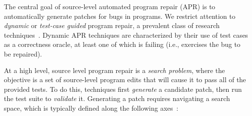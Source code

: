 \documentclass[10pt, conference]{IEEEtran}
\begin{document}
The central goal of source-level automated program repair (APR) is to
automatically generate patches for bugs in programs. We restrict attention to
\emph{dynamic} or \emph{test-case guided} program repair, a prevalent class of
research techniques~\cite{cacm19}.  Dynamic APR techniques
are characterized by their use of test cases as a correctness oracle,
at least one of which is failing (i.e., exercises the bug
to be repaired).

At a high level, source level program repair is a \emph{search problem}, where
the objective is a set of source-level program edits that will cause it to pass
all of the provided tests. To do this, techniques first \emph{generate} a candidate
patch, then run the test suite to \emph{validate} it. Generating a patch
requires navigating a search space, which is typically defined along the
following axes~\cite{ae,sqjo}:
\end{document}
